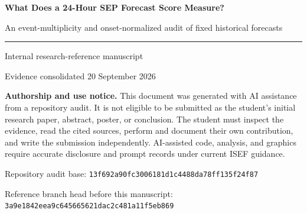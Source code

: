 \documentclass[11pt]{article}
\begin{document}

\begin{titlepage}
\centering
\vspace*{1.3cm}
{\color{navy}\Huge\bfseries What Does a 24-Hour SEP Forecast Score Measure?\par}
\vspace{0.45cm}
{\Large An event-multiplicity and onset-normalized audit of fixed historical forecasts\par}
\vspace{1.1cm}
\rule{0.82\textwidth}{0.8pt}\par
\vspace{0.8cm}
{\large Internal research-reference manuscript\par}
\vspace{0.25cm}
{\large Evidence consolidated 20 September 2026\par}
\vfill
\begin{minipage}{0.88\textwidth}
\colorbox{light}{\parbox{0.94\textwidth}{
\textbf{Authorship and use notice.} This document was generated with AI assistance from a repository audit. It is not eligible to be submitted as the student's initial research paper, abstract, poster, or conclusion. The student must inspect the evidence, read the cited sources, perform and document their own contribution, and write the submission independently. AI-assisted code, analysis, and graphics require accurate disclosure and prompt records under current ISEF guidance.
}}
\end{minipage}
\vfill
{\small Repository audit base: \texttt{13f692a90fc3006181d1c4488da78ff135f24f87}\par
Reference branch head before this manuscript: \texttt{3a9e1842eea9c645665621dac2c481a11f5eb869}}
\end{titlepage}
\clearpage
{}
\end{document}
